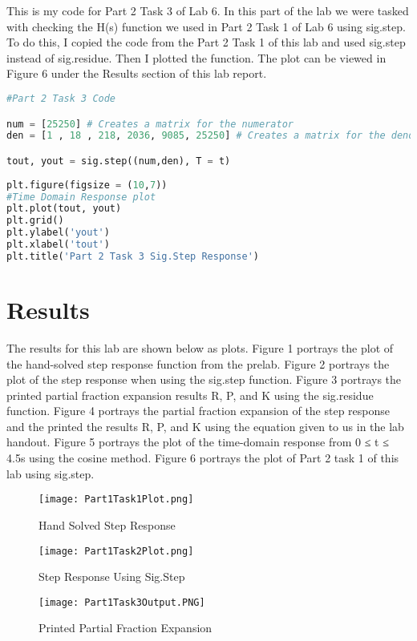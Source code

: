 \documentclass[12pt]{report}
\begin{document}
\newpage

{This is my code for Part 2 Task 3 of Lab 6. In this part of the lab we were tasked with checking the H(s) function we used in Part 2 Task 1 of Lab 6 using sig.step. To do this, I copied the code from the Part 2 Task 1 of this lab and used sig.step instead of sig.residue. Then I plotted the function. The plot can be viewed in Figure 6 under the Results section of this lab report. }
\begin{lstlisting}[language=Python]
#Part 2 Task 3 Code

num = [25250] # Creates a matrix for the numerator
den = [1 , 18 , 218, 2036, 9085, 25250] # Creates a matrix for the denominator

tout, yout = sig.step((num,den), T = t)
        
plt.figure(figsize = (10,7))
#Time Domain Response plot
plt.plot(tout, yout)
plt.grid()
plt.ylabel('yout')
plt.xlabel('tout')
plt.title('Part 2 Task 3 Sig.Step Response')   
\end{lstlisting}

\section{Results}

The results for this lab are shown below as plots. Figure 1 portrays the plot of the hand-solved step response function from the prelab. Figure 2 portrays the plot of the step response when using the sig.step function. Figure 3 portrays the printed partial fraction expansion results R, P, and K using the sig.residue function. Figure 4 portrays the partial fraction expansion of the step response and the printed the results R, P, and K using the equation given to us in the lab handout. Figure 5 portrays the plot of the time-domain response from 0 ≤ t ≤ 4.5s using the cosine method. Figure 6 portrays the plot of Part 2 task 1 of this lab using sig.step.



\begin{figure}
\texttt{[image: Part1Task1Plot.png]}
\caption{Hand Solved Step Response}
\end{figure}

\begin{figure}
\texttt{[image: Part1Task2Plot.png]}
\caption{Step Response Using Sig.Step }
\end{figure}

\begin{figure}
\texttt{[image: Part1Task3Output.PNG]}
\caption{Printed Partial Fraction Expansion}
\end{figure}
\end{document}
